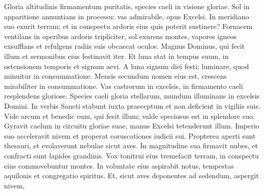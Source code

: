 \begin{biblechapter}
\begin{biblechapter}
\begin{biblechapter}
\begin{biblechapter}
\begin{biblechapter}
\begin{biblechapter}
\begin{biblechapter}
\begin{biblechapter}
\begin{biblechapter}
\begin{biblechapter}
\begin{biblechapter}
\begin{biblechapter}
\begin{biblechapter}
\begin{biblechapter}
\begin{biblechapter}
\begin{biblechapter}
\begin{biblechapter}
\begin{biblechapter}
\begin{biblechapter}
\begin{biblechapter}
\begin{biblechapter}
\begin{biblechapter}
\begin{biblechapter}
\begin{biblechapter}
\begin{biblechapter}
\begin{biblechapter}
\begin{biblechapter}
\begin{biblechapter}
\begin{biblechapter}
\begin{biblechapter}
\begin{biblechapter}
\begin{biblechapter}
\begin{biblechapter}
\begin{biblechapter}
\begin{biblechapter}
\begin{biblechapter}
\begin{biblechapter}
\begin{biblechapter}
\begin{biblechapter}
\begin{biblechapter}
\begin{biblechapter}
\begin{biblechapter}
\begin{biblechapter}
\verse Gloria altitudinis firmamentum puritatis,
 species caeli in visione gloriae.
 \verse Sol in apparitione annuntians in processu:
 vas admirabile, opus Excelsi.
 \verse In meridiano suo exurit terram;
 et in conspectu ardoris eius quis poterit sustinere?
 Fornacem ventilans in operibus ardoris tripliciter,
 \verse sol exurens montes, vapores igneos exsufflans
 et refulgens radiis suis obcaecat oculos.
 \verse Magnus Dominus, qui fecit illum
 et sermonibus eius festinavit iter.
 \verse Et luna stat in tempus suum,
 in ostensionem temporis et signum aevi.
 \verse A luna signum diei festi;
 luminare, quod minuitur in consummatione.
 \verse Mensis secundum nomen eius est,
 crescens mirabiliter in consummatione.
 \verse Vas castrorum in excelsis,
 in firmamento caeli resplendens gloriose.
 \verse Species caeli gloria stellarum,
 mundum illuminans in excelsis Domini.
 \verse In verbis Sancti stabunt iuxta praeceptum
 et non deficient in vigiliis suis.
 \verse Vide arcum et benedic eum, qui fecit illum;
 valde speciosus est in splendore suo.
 \verse Gyravit caelum in circuitu gloriae suae,
 manus Excelsi tetenderunt illum.
 \verse Imperio suo acceleravit nivem
 et properat coruscationes iudicii sui.
 \verse Propterea aperti sunt thesauri,
 et evolaverunt nebulae sicut aves.
 \verse In magnitudine sua firmavit nubes,
 et confracti sunt lapides grandinis. Vox tonitrui eius tremefacit terram,
 \verse in conspectu eius commovebuntur montes.
 In voluntate eius aspirabit notus,
 \verse tempestas aquilonis et congregatio spiritus.
 \verse Et, sicut aves deponentes ad sedendum, aspergit nivem,

\end{biblechapter}
\end{biblechapter}
\end{biblechapter}
\end{biblechapter}
\end{biblechapter}
\end{biblechapter}
\end{biblechapter}
\end{biblechapter}
\end{biblechapter}
\end{biblechapter}
\end{biblechapter}
\end{biblechapter}
\end{biblechapter}
\end{biblechapter}
\end{biblechapter}
\end{biblechapter}
\end{biblechapter}
\end{biblechapter}
\end{biblechapter}
\end{biblechapter}
\end{biblechapter}
\end{biblechapter}
\end{biblechapter}
\end{biblechapter}
\end{biblechapter}
\end{biblechapter}
\end{biblechapter}
\end{biblechapter}
\end{biblechapter}
\end{biblechapter}
\end{biblechapter}
\end{biblechapter}
\end{biblechapter}
\end{biblechapter}
\end{biblechapter}
\end{biblechapter}
\end{biblechapter}
\end{biblechapter}
\end{biblechapter}
\end{biblechapter}
\end{biblechapter}
\end{biblechapter}
\end{biblechapter}
